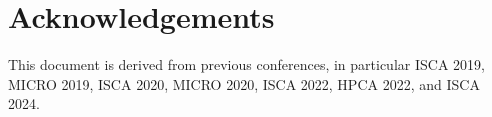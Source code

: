 \documentclass[conference]{IEEEtran}
\begin{document}
\section*{Acknowledgements}
This document is derived from previous conferences, in particular ISCA 2019,
MICRO 2019, ISCA 2020, MICRO 2020, ISCA 2022, HPCA 2022, and ISCA 2024. 





\end{document}
